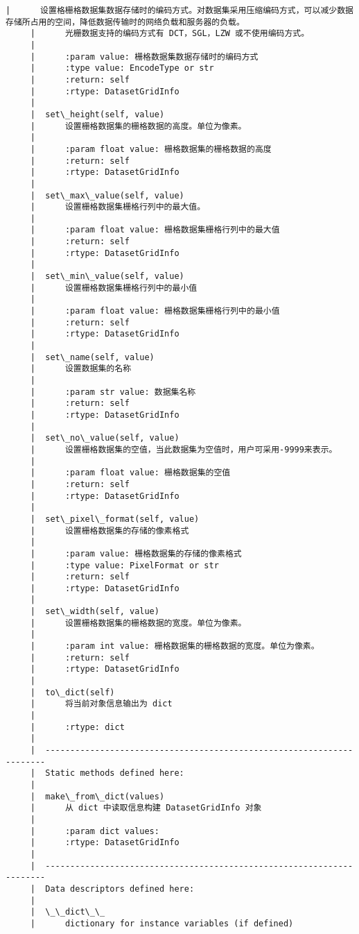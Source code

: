 \documentclass[11pt]{article}
\begin{document}
\begin{Verbatim}[commandchars=\\\{\}]
     |      设置格栅格数据集数据存储时的编码方式。对数据集采用压缩编码方式，可以减少数据存储所占用的空间，降低数据传输时的网络负载和服务器的负载。
     |      光栅数据支持的编码方式有 DCT，SGL，LZW 或不使用编码方式。
     |      
     |      :param value: 栅格数据集数据存储时的编码方式
     |      :type value: EncodeType or str
     |      :return: self
     |      :rtype: DatasetGridInfo
     |  
     |  set\_height(self, value)
     |      设置栅格数据集的栅格数据的高度。单位为像素。
     |      
     |      :param float value: 栅格数据集的栅格数据的高度
     |      :return: self
     |      :rtype: DatasetGridInfo
     |  
     |  set\_max\_value(self, value)
     |      设置栅格数据集栅格行列中的最大值。
     |      
     |      :param float value: 栅格数据集栅格行列中的最大值
     |      :return: self
     |      :rtype: DatasetGridInfo
     |  
     |  set\_min\_value(self, value)
     |      设置栅格数据集栅格行列中的最小值
     |      
     |      :param float value: 栅格数据集栅格行列中的最小值
     |      :return: self
     |      :rtype: DatasetGridInfo
     |  
     |  set\_name(self, value)
     |      设置数据集的名称
     |      
     |      :param str value: 数据集名称
     |      :return: self
     |      :rtype: DatasetGridInfo
     |  
     |  set\_no\_value(self, value)
     |      设置栅格数据集的空值，当此数据集为空值时，用户可采用-9999来表示。
     |      
     |      :param float value: 栅格数据集的空值
     |      :return: self
     |      :rtype: DatasetGridInfo
     |  
     |  set\_pixel\_format(self, value)
     |      设置栅格数据集的存储的像素格式
     |      
     |      :param value: 栅格数据集的存储的像素格式
     |      :type value: PixelFormat or str
     |      :return: self
     |      :rtype: DatasetGridInfo
     |  
     |  set\_width(self, value)
     |      设置栅格数据集的栅格数据的宽度。单位为像素。
     |      
     |      :param int value: 栅格数据集的栅格数据的宽度。单位为像素。
     |      :return: self
     |      :rtype: DatasetGridInfo
     |  
     |  to\_dict(self)
     |      将当前对象信息输出为 dict
     |      
     |      :rtype: dict
     |  
     |  ----------------------------------------------------------------------
     |  Static methods defined here:
     |  
     |  make\_from\_dict(values)
     |      从 dict 中读取信息构建 DatasetGridInfo 对象
     |      
     |      :param dict values:
     |      :rtype: DatasetGridInfo
     |  
     |  ----------------------------------------------------------------------
     |  Data descriptors defined here:
     |  
     |  \_\_dict\_\_
     |      dictionary for instance variables (if defined)

\end{Verbatim}
\end{document}

